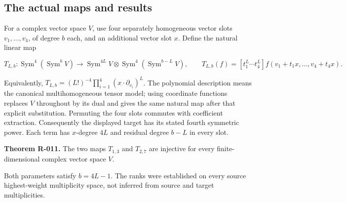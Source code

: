 \documentclass[
  10pt,
]{article}
\begin{document}
\subsection{The actual maps and
results}\label{the-actual-maps-and-results}

For a complex vector space \(V\), use four separately homogeneous vector
slots \(v_1,\ldots,v_4\), of degree \(b\) each, and an additional vector
slot \(x\). Define the natural linear map

\[
 T_{L,b}:\operatorname{Sym}^4(\operatorname{Sym}^bV)
 \longrightarrow \operatorname{Sym}^{4L}V\otimes
 \operatorname{Sym}^4(\operatorname{Sym}^{b-L}V),
 \qquad
 T_{L,b}(f)=[t_1^L\cdots t_4^L]
 f(v_1+t_1x,\ldots,v_4+t_4x).
\]

Equivalently,
\(T_{L,b}=(L!)^{-4}\prod_{i=1}^4(x\cdot\partial_{v_i})^L\). The
polynomial description means the canonical multihomogeneous tensor
model; using coordinate functions replaces \(V\) throughout by its dual
and gives the same natural map after that explicit substitution.
Permuting the four slots commutes with coefficient extraction.
Consequently the displayed target has its stated fourth symmetric power.
Each term has \(x\)-degree \(4L\) and residual degree \(b-L\) in every
slot.

\textbf{Theorem R-011.} The two maps \(T_{1,3}\) and \(T_{2,7}\) are
injective for every finite-dimensional complex vector space \(V\).

Both parameters satisfy \(b=4L-1\). The ranks were established on every
source highest-weight multiplicity space, not inferred from source and
target multiplicities.
\end{document}
